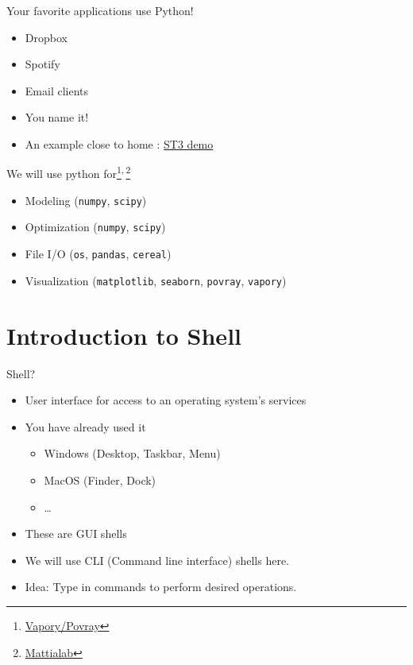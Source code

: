 \documentclass[presentation]{beamer}
\begin{document}
\begin{frame}[label={sec:orgc892ee3}]{Your favorite applications use Python!}
\begin{itemize}
\item Dropbox
\item Spotify
\item Email clients
\item You name it!
\item An example close to home : \href{code/clangformat.cpp}{ST3 demo}
\end{itemize}
\end{frame}

\begin{frame}[label={sec:org3b2e28b},fragile]{We will use python for\footnote{\href{https://zulko.github.io/blog/2014/11/13/things-you-can-do-with-python-and-pov-ray/\#disqus\_thread}{Vapory/Povray}}\textsuperscript{,}\,\footnote{\href{http://mattia-lab.com/work/soft-filaments/}{Mattialab}}}
 \begin{itemize}
\item Modeling (\texttt{numpy}, \texttt{scipy})
\item Optimization (\texttt{numpy}, \texttt{scipy})
\item File I/O (\texttt{os}, \texttt{pandas}, \texttt{cereal})
\item Visualization (\texttt{matplotlib}, \texttt{seaborn}, \texttt{povray}, \texttt{vapory})
\end{itemize}
\end{frame}

\section{Introduction to Shell}
\label{sec:org9845f54}
\begin{frame}[label={sec:orgc4715bb}]{Shell?}
\begin{itemize}
\item User interface for access to an operating system's services
\item You have already used it
\begin{itemize}
\item Windows (Desktop, Taskbar, Menu)
\item MacOS (Finder, Dock)
\item \ldots{}
\end{itemize}
\item These are GUI shells
\item We will use CLI (Command line interface) shells here.
\item Idea: Type in commands to perform desired operations.
\end{itemize}
\end{frame}
\end{document}
